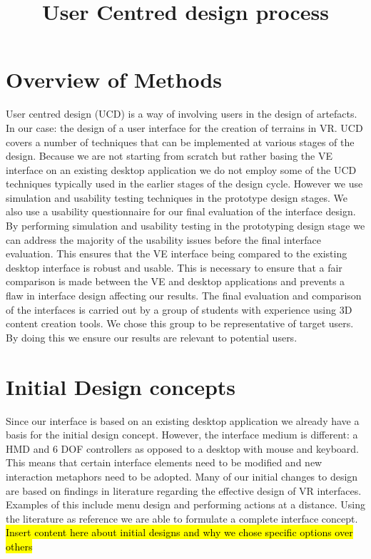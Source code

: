 \documentclass{article}
\title{User Centred design process}
\begin{document}
\maketitle
\section{Overview of Methods}

User centred design (UCD) is a way of involving users in the design of artefacts\cite{abras2004user}. In our case: the design of a user interface for the creation of terrains in VR.
\newline\newline
UCD covers a number of techniques that can be implemented at various stages of the design\cite{abras2004user}. Because we are not starting from scratch but rather basing the VE interface on an existing desktop application we do not employ some of the UCD techniques typically used in the earlier stages of the design cycle\cite{McLoone2004}. However we use simulation and usability testing techniques in the prototype design stages. We also use a usability questionnaire for our final evaluation of the interface design.
\newline\newline 
By performing simulation and usability testing in the prototyping design stage we can address the majority of the usability issues before the final interface evaluation\cite{nielsen1990heuristic}. This ensures that the VE interface being compared to the existing desktop interface is robust and usable. This is necessary to ensure that a fair comparison is made between the VE and desktop applications and prevents a flaw in interface design affecting our results.
\newline\newline
The final evaluation and comparison of the interfaces is carried out by a group of students with experience using 3D content creation tools. We chose this group to be representative of target users\cite{Bowman2002}. By doing this we ensure our results are relevant to potential users.

\section{Initial Design concepts}
Since our interface is based on an existing desktop application we already have a basis for the initial design concept. However, the interface medium is different: a HMD and 6 DOF controllers as opposed to a desktop with mouse and keyboard. This means that certain interface elements need to be modified and new interaction metaphors need to be adopted.
\newline\newline
Many of our initial changes to design are based on findings in literature regarding the effective design of VR interfaces. Examples of this include menu design and performing actions at a distance. Using the literature as reference we are able to formulate a complete interface concept.
\newline\newline
\hl{Insert content here about initial designs and why we chose specific options over others}
\end{document}
